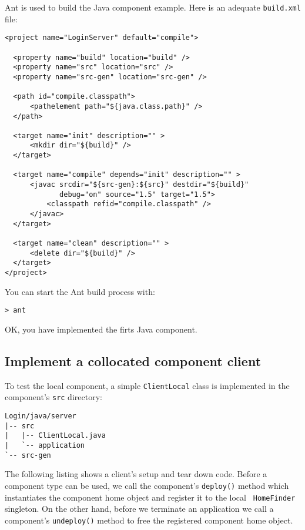 Ant is used to build the Java component example. Here is an adequate
{\tt build.xml} file:
\begin{footnotesize}
\begin{verbatim}
<project name="LoginServer" default="compile">

  <property name="build" location="build" />
  <property name="src" location="src" />
  <property name="src-gen" location="src-gen" />

  <path id="compile.classpath">
      <pathelement path="${java.class.path}" />
  </path>

  <target name="init" description="" >
      <mkdir dir="${build}" />
  </target>
 
  <target name="compile" depends="init" description="" >
      <javac srcdir="${src-gen}:${src}" destdir="${build}" 
             debug="on" source="1.5" target="1.5">
          <classpath refid="compile.classpath" />  
      </javac>
  </target>

  <target name="clean" description="" >
      <delete dir="${build}" />
  </target>
</project>
\end{verbatim}
\end{footnotesize}

You can start the Ant build process with:
\begin{footnotesize}
\begin{verbatim}
> ant
\end{verbatim}
\end{footnotesize}

OK, you have implemented the firts Java component.


\subsection{Implement a collocated component client}
\label{subsection:ImplementLocalComponentClient}
To test the local component, a simple {\tt ClientLocal} class is implemented in 
the component's {\tt src} directory:
\begin{footnotesize}
\begin{verbatim}
Login/java/server
|-- src
|   |-- ClientLocal.java
|   `-- application
`-- src-gen
\end{verbatim}
\end{footnotesize}

The following listing shows a client's setup and tear down code. Before 
a component type can be used, we call the component's {\tt deploy()} method
which instantiates the component home object and register it to the local {\tt
HomeFinder} singleton.
On the other hand, before we terminate an application we call a
component's {\tt undeploy()} method to free the registered component home
object. 
	
